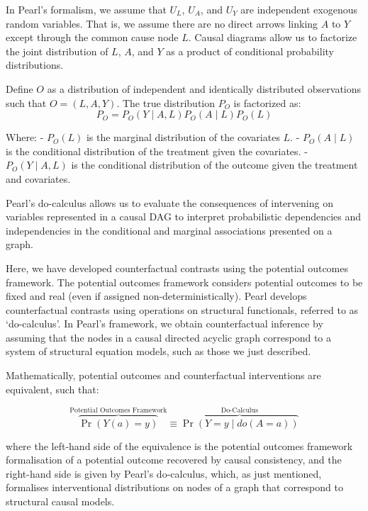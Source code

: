 \documentclass[
  single column]{article}
\begin{document}
In Pearl's formalism, we assume that \(U_L\), \(U_A\), and \(U_Y\) are
independent exogenous random variables. That is, we assume there are no
direct arrows linking \(A\) to \(Y\) except through the common cause
node \(L\). Causal diagrams allow us to factorize the joint distribution
of \(L\), \(A\), and \(Y\) as a product of conditional probability
distributions.

Define \(O\) as a distribution of independent and identically
distributed observations such that \(O = (L, A, Y)\). The true
distribution \(P_O\) is factorized as: \[
P_O = P_O(Y \mid A, L) P_O(A \mid L) P_O(L)
\]

Where: - \(P_O(L)\) is the marginal distribution of the covariates
\(L\). - \(P_O(A \mid L)\) is the conditional distribution of the
treatment given the covariates. - \(P_O(Y \mid A, L)\) is the
conditional distribution of the outcome given the treatment and
covariates.

Pearl's do-calculus allows us to evaluate the consequences of
intervening on variables represented in a causal DAG to interpret
probabilistic dependencies and independencies in the conditional and
marginal associations presented on a graph.

Here, we have developed counterfactual contrasts using the potential
outcomes framework. The potential outcomes framework considers potential
outcomes to be fixed and real (even if assigned non-deterministically).
Pearl develops counterfactual contrasts using operations on structural
functionals, referred to as `do-calculus'. In Pearl's framework, we
obtain counterfactual inference by assuming that the nodes in a causal
directed acyclic graph correspond to a system of structural equation
models, such as those we just described.

Mathematically, potential outcomes and counterfactual interventions are
equivalent, such that:

\[
\overbrace{\Pr(Y(a) = y)}^{\text{Potential Outcomes Framework}} \equiv \overbrace{\Pr(Y = y \mid do(A = a))}^{\text{Do-Calculus}}
\]

where the left-hand side of the equivalence is the potential outcomes
framework formalisation of a potential outcome recovered by causal
consistency, and the right-hand side is given by Pearl's do-calculus,
which, as just mentioned, formalises interventional distributions on
nodes of a graph that correspond to structural causal models.
\end{document}

